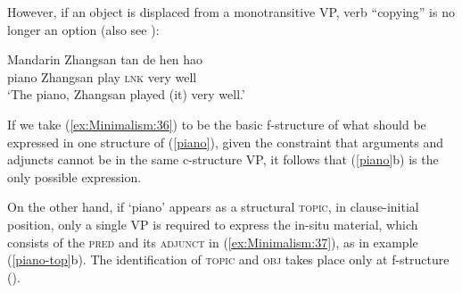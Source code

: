\documentclass[output=paper,hidelinks]{langscibook}
\begin{document}
 
However, if an object is displaced from a monotransitive VP, verb
``copying'' is no longer an option (also see \citealp[53]{huang82}):

\ea\label{piano-top} Mandarin
\ex
\gll {}  Zhangsan tan {\gapline} de  hen hao\\
piano Zhangsan play    {\gapline}      \textsc{lnk}  very   well\\
\glt `The piano, Zhangsan played (it) very well.'
\z\z

If we take (\ref{ex:Minimalism:36}) to be the basic f-structure of what should be
expressed in one structure of (\ref{piano}), given the constraint that
arguments and adjuncts cannot be in the same c-structure VP, it
follows that (\ref{piano}b) is the only possible expression.

\ea\label{ex:Minimalism:36}
{%
}
\z

On the other hand, if `piano' appears as a structural \textsc{topic},
in clause-initial position, only a single VP is required to express
the in-situ material, which consists of the \textsc{pred} and its
\textsc{adjunct} in (\ref{ex:Minimalism:37}), as in example (\ref{piano-top}b). The
identification of \textsc{topic} and \textsc{obj} takes place only at
f-structure (\citealp{kaplzaen89}).

\ea\label{ex:Minimalism:37}
\z
\end{document}
